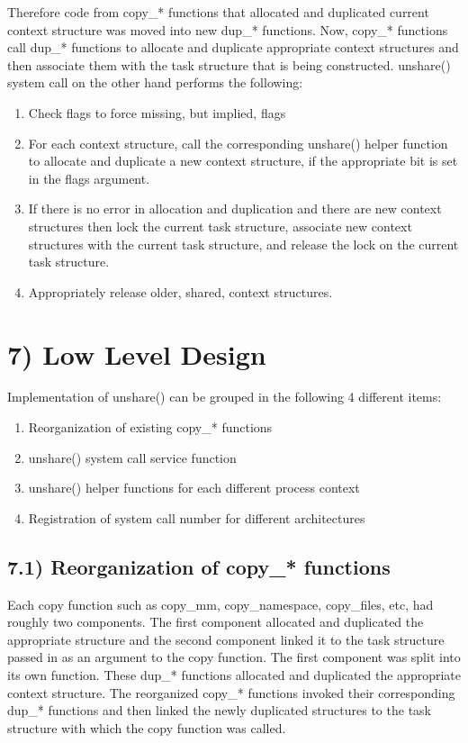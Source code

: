 \documentclass[a4paper,8pt,english]{sphinxmanual}
\begin{document}
Therefore code from copy\_* functions that allocated and duplicated
current context structure was moved into new dup\_* functions. Now,
copy\_* functions call dup\_* functions to allocate and duplicate
appropriate context structures and then associate them with the
task structure that is being constructed. unshare() system call on
the other hand performs the following:
\begin{enumerate}
\item {} 
Check flags to force missing, but implied, flags

\item {} 
For each context structure, call the corresponding unshare()
helper function to allocate and duplicate a new context
structure, if the appropriate bit is set in the flags argument.

\item {} 
If there is no error in allocation and duplication and there
are new context structures then lock the current task structure,
associate new context structures with the current task structure,
and release the lock on the current task structure.

\item {} 
Appropriately release older, shared, context structures.

\end{enumerate}


\section{7) Low Level Design}
\label{userspace-api/unshare:low-level-design}
Implementation of unshare() can be grouped in the following 4 different
items:
\begin{enumerate}
\item {} 
Reorganization of existing copy\_* functions

\item {} 
unshare() system call service function

\item {} 
unshare() helper functions for each different process context

\item {} 
Registration of system call number for different architectures

\end{enumerate}


\subsection{7.1) Reorganization of copy\_* functions}
\label{userspace-api/unshare:reorganization-of-copy-functions}
Each copy function such as copy\_mm, copy\_namespace, copy\_files,
etc, had roughly two components. The first component allocated
and duplicated the appropriate structure and the second component
linked it to the task structure passed in as an argument to the copy
function. The first component was split into its own function.
These dup\_* functions allocated and duplicated the appropriate
context structure. The reorganized copy\_* functions invoked
their corresponding dup\_* functions and then linked the newly
duplicated structures to the task structure with which the
copy function was called.
\end{document}
